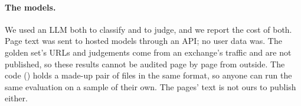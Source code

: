 \paragraph{The models.} We used an LLM both to classify and to judge, and we report the cost of both. Page text was sent to hosted models through an API; no user data was. The golden set's URLs and judgements come from an exchange's traffic and are not published, so these results cannot be audited page by page from outside. The code (\repo) holds a made-up pair of files in the same format, so anyone can run the same evaluation on a sample of their own. The pages' text is not ours to publish either.
